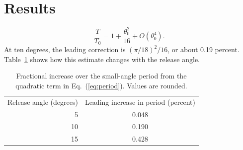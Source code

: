 \section{Results}
\begin{equation}
  \frac{T}{T_0} = 1 + \frac{\theta_0^2}{16} + O(\theta_0^4).
  \label{eq:period}
\end{equation}
At ten degrees, the leading correction is $(\pi/18)^2/16$, or about
0.19 percent. Table~\ref{tab:angles} shows how this estimate changes with
the release angle.

\begin{table}[h]
\centering
\begin{tabular}{rc}
Release angle (degrees) & Leading increase in period (percent) \\
5 & 0.048 \\
10 & 0.190 \\
15 & 0.428
\end{tabular}
\caption{Fractional increase over the small-angle period from the quadratic
term in Eq.~(\ref{eq:period}). Values are rounded.}
\label{tab:angles}
\end{table}
